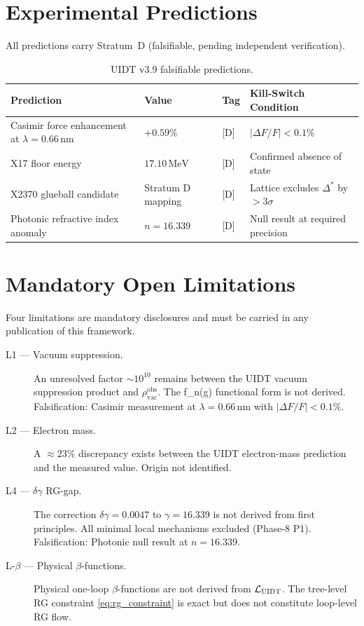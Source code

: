 \documentclass[12pt,a4paper]{article}
\newcommand{\UIDT}{\textsc{UIDT}}
\newcommand{\Lag}{\mathcal{L}}
\newcommand{\gam}{\gamma}
\newcommand{\Dstar}{\Delta^*}
\newcommand{\rhobs}{\rho_{\mathrm{vac}}^{\mathrm{obs}}}
\begin{document}
\section{Experimental Predictions}
\label{sec:predictions}

All predictions carry Stratum~D (falsifiable, pending independent verification).

\begin{table}[h!]
  \centering
  \caption{\UIDT{} v3.9 falsifiable predictions.}
  \label{tab:predictions}
  \renewcommand{\arraystretch}{1.3}
  \begin{tabular}{p{4cm}p{3.5cm}p{2.5cm}p{3.5cm}}
    \toprule
    Prediction & Value & Tag & Kill-Switch Condition \\
    \midrule
    Casimir force enhancement at $\lambda = 0.66\,\text{nm}$
      & $+0.59\%$ & [D] & $|\Delta F/F| < 0.1\%$ \\
    X17 floor energy
      & $17.10\,\text{MeV}$ & [D] & Confirmed absence of state \\
    X2370 glueball candidate
      & Stratum D mapping & [D] & Lattice excludes $\Dstar$ by $> 3\sigma$ \\
    Photonic refractive index anomaly
      & $n = 16.339$ & [D] & Null result at required precision \\
    \bottomrule
  \end{tabular}
\end{table}

\section{Mandatory Open Limitations}
\label{sec:limitations}

Four limitations are mandatory disclosures and must be carried in any
publication of this framework.

\begin{description}
  \item[L1 — Vacuum suppression.]
    An unresolved factor $\sim 10^{10}$ remains between the \UIDT{} vacuum
    suppression product and $\rhobs$. The f_n(g) functional form is not derived.
    Falsification: Casimir measurement at $\lambda = 0.66\,\text{nm}$ with
    $|\Delta F/F| < 0.1\%$.
  \item[L2 — Electron mass.]
    A $\approx 23\%$ discrepancy exists between the \UIDT{} electron-mass
    prediction and the measured value. Origin not identified.
  \item[L4 — $\delta\gam$ RG-gap.]
    The correction $\delta\gam = 0.0047$ to $\gam = 16.339$ is not derived
    from first principles. All minimal local mechanisms excluded (Phase-8 P1).
    Falsification: Photonic null result at $n = 16.339$.
  \item[L-$\beta$ — Physical $\beta$-functions.]
    Physical one-loop $\beta$-functions are not derived from $\Lag_{\UIDT}$.
    The tree-level RG constraint \eqref{eq:rg_constraint} is exact but does not
    constitute loop-level RG flow.
\end{description}
\end{document}
